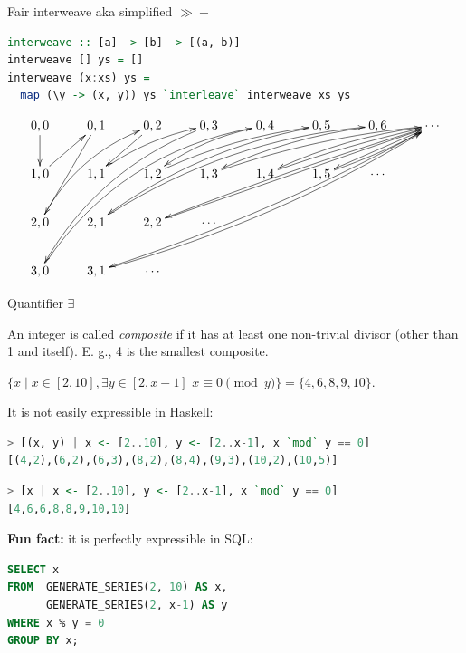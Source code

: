\documentclass[handout]{beamer}
\begin{document}
\begin{frame}[fragile]{Fair interweave aka simplified $\gg\!\!-$}

\begin{lstlisting}[language=Haskell]
interweave :: [a] -> [b] -> [(a, b)]
interweave [] ys = []
interweave (x:xs) ys =
  map (\y -> (x, y)) ys `interleave` interweave xs ys
\end{lstlisting}

$$\xymatrix{
0,0 \ar[d]              & 0,1 \ar[ddl]     & 0,2 \ar[dl]  & 0,3 \ar@/_1.4pc/[dddlll] & 0,4 \ar@/_0.5pc/[dll] & 0,5 \ar@/_1pc/[ddllll] & 0,6 \ar@/_0.5pc/[dlll] & \cdots \ar@/_0.5pc/[dlll] \ar@/_0.2pc/[ddlllll] \ar[dll] \ar@/^0.6pc/[dddllllll] \\
1,0 \ar[ur]             & 1,1 \ar@/^0.5pc/[urr]     & 1,2 \ar@/^0.5pc/[urrr] & 1,3 \ar@/^0.5pc/[urrrr]       & 1,4 \ar@/^0.2pc/[urrr] & 1,5 \ar@/_0.2pc/[urr] & \cdots \\
2,0 \ar@/^1pc/[uurr]    & 2,1 \ar@/^1.3pc/[uurrrrr]   & 2,2 \ar[uurrrrr]  & \cdots \\
3,0 \ar@/^2pc/[uuurrrr] & 3,1 \ar@/_0.9pc/[uuurrrrrr] & \cdots \\
}$$

\end{frame}

\begin{frame}[fragile]{Quantifier $\exists$}
\begin{adjustwidth}{-1em}{-1em}

An integer is called {\em composite} if it has at least one non-trivial divisor (other than 1 and itself). E. g., 4 is the smallest composite.

\bigskip

$ \{ x \mid x \in [2, 10], \exists y \in [2, x-1] \,\, x \equiv 0 \pmod y \} =
\{ 4,6,8,9,10 \}$.

\bigskip

\pause

It is not easily expressible in Haskell:
\begin{lstlisting}[language=Haskell]
> [(x, y) | x <- [2..10], y <- [2..x-1], x `mod` y == 0]
[(4,2),(6,2),(6,3),(8,2),(8,4),(9,3),(10,2),(10,5)]
\end{lstlisting}

\pause

\begin{lstlisting}[language=Haskell]
> [x | x <- [2..10], y <- [2..x-1], x `mod` y == 0]
[4,6,6,8,8,9,10,10]
\end{lstlisting}

\pause

{\bf Fun fact:} it is perfectly expressible in SQL:
\begin{lstlisting}[language=SQL]
SELECT x
FROM  GENERATE_SERIES(2, 10) AS x,
      GENERATE_SERIES(2, x-1) AS y
WHERE x % y = 0
GROUP BY x;
\end{lstlisting}

\end{adjustwidth}
\end{frame}
\end{document}
